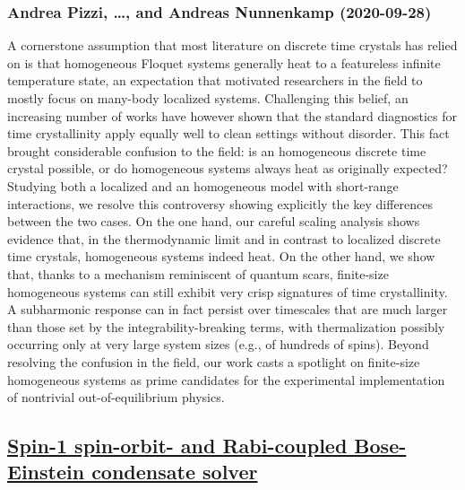 \subsubsection*{Andrea Pizzi, \dots, and Andreas Nunnenkamp (2020-09-28)}
A cornerstone assumption that most literature on discrete time crystals has
relied on is that homogeneous Floquet systems generally heat to a featureless
infinite temperature state, an expectation that motivated researchers in the
field to mostly focus on many-body localized systems. Challenging this belief,
an increasing number of works have however shown that the standard diagnostics
for time crystallinity apply equally well to clean settings without disorder.
This fact brought considerable confusion to the field: is an homogeneous
discrete time crystal possible, or do homogeneous systems always heat as
originally expected? Studying both a localized and an homogeneous model with
short-range interactions, we resolve this controversy showing explicitly the
key differences between the two cases. On the one hand, our careful scaling
analysis shows evidence that, in the thermodynamic limit and in contrast to
localized discrete time crystals, homogeneous systems indeed heat. On the other
hand, we show that, thanks to a mechanism reminiscent of quantum scars,
finite-size homogeneous systems can still exhibit very crisp signatures of time
crystallinity. A subharmonic response can in fact persist over timescales that
are much larger than those set by the integrability-breaking terms, with
thermalization possibly occurring only at very large system sizes (e.g., of
hundreds of spins). Beyond resolving the confusion in the field, our work casts
a spotlight on finite-size homogeneous systems as prime candidates for the
experimental implementation of nontrivial out-of-equilibrium physics.

\subsection*{\href{http://arxiv.org/abs/2009.13507v1}{Spin-1 spin-orbit- and Rabi-coupled Bose-Einstein condensate solver}}
